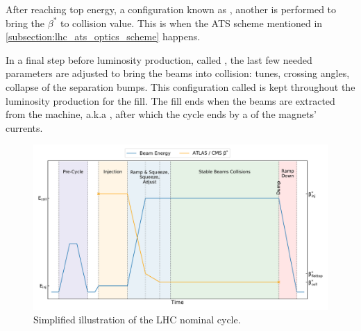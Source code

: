 After reaching top energy, a configuration known as , another  is performed to bring the \(\beta^{\ast}\) to collision value.
This is when the ATS scheme mentioned in \cref{subsection:lhc_ats_optics_scheme} happens.

In a final step before luminosity production, called , the last few needed parameters are adjusted to bring the beams into collision: tunes, crossing angles, collapse of the separation bumps.
This configuration called  is kept throughout the luminosity production for the fill.
The fill ends when the beams are extracted from the machine, a.k.a , after which the cycle ends by a  of the magnets' currents.




\begin{figure}[!hbt]
    \centering
    \includegraphics*[width=0.9\linewidth]{Figures/Optics_Measurements_Corrections_at_LHC/lhc_cycle.pdf}
    \caption{Simplified illustration of the LHC nominal cycle.}
    \label{figure:lhc_cycle}
\end{figure}

